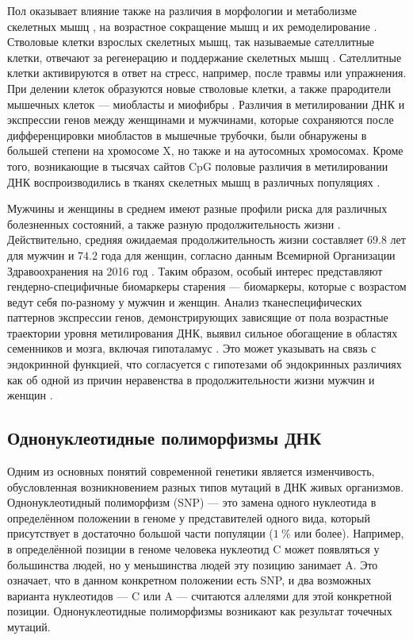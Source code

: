 Пол оказывает влияние также на различия в морфологии и метаболизме скелетных мышц \autocite{Haizlip2015, Lundsgaard2014}, на возрастное сокращение мышц и их ремоделирование \autocite{Gheller2016}. Стволовые клетки взрослых скелетных мышц, так называемые сателлитные клетки, отвечают за регенерацию и поддержание скелетных мышц \autocite{Saini2013}. Сателлитные клетки активируются в ответ на стресс, например, после травмы или упражнения. При делении клеток образуются новые стволовые клетки, а также прародители мышечных клеток --- миобласты и миофибры \autocite{Yin2013}. Различия в метилировании ДНК и экспрессии генов между женщинами и мужчинами, которые сохраняются после дифференцировки миобластов в мышечные трубочки, были обнаружены в большей степени на хромосоме X, но также и на аутосомных хромосомах. Кроме того, возникающие в тысячах сайтов CpG половые различия в метилировании ДНК воспроизводились в тканях скелетных мышц в различных популяциях \autocite{Davegardh2019}.

Мужчины и женщины в среднем имеют разные профили риска для различных болезненных состояний, а также разную продолжительность жизни \autocite{RegitzZagrosek2012}. Действительно, средняя ожидаемая продолжительность жизни составляет $69.8$ лет для мужчин и $74.2$ года для женщин, согласно данным Всемирной Организации Здравоохранения на 2016 год \autocite{WHO2016}. Таким образом, особый интерес представляют гендерно-специфичные биомаркеры старения --- биомаркеры, которые с возрастом ведут себя по-разному у мужчин и женщин. Анализ тканеспецифических паттернов экспрессии генов, демонстрирующих зависящие от пола возрастные траектории уровня метилирования ДНК, выявил сильное обогащение в областях семенников и мозга, включая гипоталамус \autocite{McCartney2019}. Это может указывать на связь с эндокринной функцией, что согласуется с гипотезами об эндокринных различиях как об одной из причин неравенства в продолжительности жизни мужчин и женщин \autocite{Austad2016, Ashpole2017}.

\subsection{Однонуклеотидные полиморфизмы ДНК}\label{subsec:ch1/sec1/subsec5}

Одним из основных понятий современной генетики является изменчивость, обусловленная возникновением разных типов мутаций в ДНК живых организмов. Однонуклеотидный полиморфизм (SNP) --- это замена одного нуклеотида в определённом положении в геноме у представителей одного вида, который присутствует в достаточно большой части популяции ($1~\%$ или более). Например, в определённой позиции в геноме человека нуклеотид C может появляться у большинства людей, но у меньшинства людей эту позицию занимает A. Это означает, что в данном конкретном положении есть SNP, и два возможных варианта нуклеотидов --- C или A --- считаются аллелями для этой конкретной позиции. Однонуклеотидные полиморфизмы возникают как результат точечных мутаций. 

